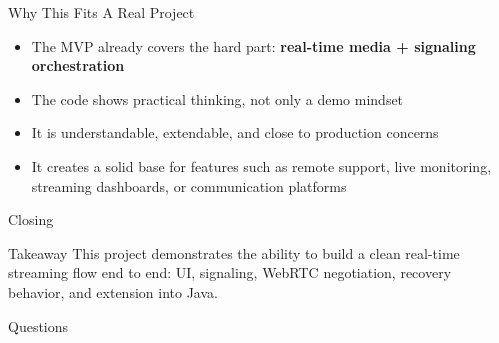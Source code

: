 \documentclass[aspectratio=169]{beamer}
\begin{document}
\begin{frame}{Why This Fits A Real Project}
  \begin{itemize}
    \item The MVP already covers the hard part: \textbf{real-time media + signaling orchestration}
    \item The code shows practical thinking, not only a demo mindset
    \item It is understandable, extendable, and close to production concerns
    \item It creates a solid base for features such as remote support, live monitoring, streaming dashboards, or communication platforms
  \end{itemize}
\end{frame}

\begin{frame}{Closing}
  \begin{block}{Takeaway}
    This project demonstrates the ability to build a clean real-time streaming flow end to end: UI, signaling, WebRTC negotiation, recovery behavior, and extension into Java.
  \end{block}

  \vspace{0.5em}
  \begin{center}
    \Large Questions
  \end{center}
\end{frame}
\end{document}
